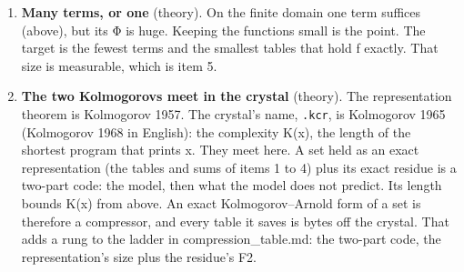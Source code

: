 \begin{enumerate}
\item \textbf{Many terms, or one} (theory). On the finite domain one term suffices (above), but its Φ is huge. Keeping the functions small is the point. The target is the fewest terms and the smallest tables that hold f exactly. That size is measurable, which is item 5.
\item \textbf{The two Kolmogorovs meet in the crystal} (theory). The representation theorem is Kolmogorov 1957. The crystal's name, \texttt{.\allowbreak{}kcr}, is Kolmogorov 1965~\cite{src:Kolmogorov-1965} (Kolmogorov 1968 in English): the complexity K(x), the length of the shortest program that prints x. They meet here. A set held as an exact representation (the tables and sums of items 1 to 4) plus its exact residue is a two-part code: the model, then what the model does not predict. Its length bounds K(x) from above. An exact Kolmogorov–Arnold form of a set is therefore a compressor, and every table it saves is bytes off the crystal. That adds a rung to the ladder in compression\_\allowbreak{}table.md: the two-part code, the representation's size plus the residue's F2.
\end{enumerate}

